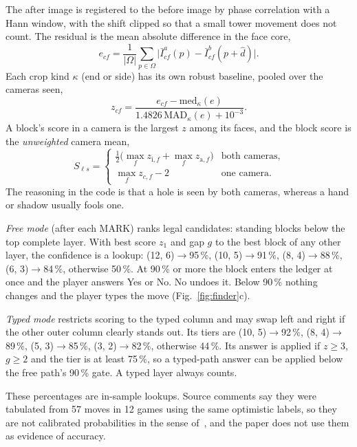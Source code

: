 \documentclass[conference,10pt]{IEEEtran}
\begin{document}
The after image is registered to the before image by phase correlation with a Hann window, with the shift clipped so that a small tower movement does not count. The residual is the mean absolute difference in the face core,
\begin{equation}
e_{cf}=\frac{1}{|\Omega|}\sum_{p\in\Omega}\bigl|\bar I^{a}_{cf}(p)-\bar I^{b}_{cf}(p+\hat d)\bigr|.
\end{equation}
Each crop kind $\kappa$ (end or side) has its own robust baseline, pooled over the cameras seen,
\begin{equation}
z_{cf}=\frac{e_{cf}-\mathrm{med}_\kappa(e)}{1.4826\,\mathrm{MAD}_\kappa(e)+10^{-3}}.
\end{equation}
A block's score in a camera is the largest $z$ among its faces, and the block score is the \emph{unweighted} camera mean,
\begin{equation}
S_{\ell s}=\begin{cases}\tfrac12\bigl(\max_{f}z_{\mathrm{i},f}+\max_{f}z_{\mathrm{a},f}\bigr) & \text{both cameras,}\\ \max_{f}z_{c,f}-2 & \text{one camera.}\end{cases}
\end{equation}
The reasoning in the code is that a hole is seen by both cameras, whereas a hand or shadow usually fools one.

\emph{Free mode} (after each MARK) ranks legal candidates: standing blocks below the top complete layer. With best score $z_1$ and gap $g$ to the best block of any other layer, the confidence is a lookup: (12, 6)$\to$95\,\%, (10, 5)$\to$91\,\%, (8, 4)$\to$88\,\%, (6, 3)$\to$84\,\%, otherwise 50\,\%. At 90\,\% or more the block enters the ledger at once and the player answers Yes or No. No undoes it. Below 90\,\% nothing changes and the player types the move (Fig.~\ref{fig:finder}c).

\emph{Typed mode} restricts scoring to the typed column and may swap left and right if the other outer column clearly stands out. Its tiers are (10, 5)$\to$92\,\%, (8, 4)$\to$89\,\%, (5, 3)$\to$85\,\%, (3, 2)$\to$82\,\%, otherwise 44\,\%. Its answer is applied if $z\geq3$, $g\geq2$ and the tier is at least 75\,\%, so a typed-path answer can be applied below the free path's 90\,\% gate. A typed layer always counts.

These percentages are in-sample lookups. Source comments say they were tabulated from 57 moves in 12 games using the same optimistic labels, so they are not calibrated probabilities in the sense of~\cite{guo2017}, and the paper does not use them as evidence of accuracy.
\end{document}
